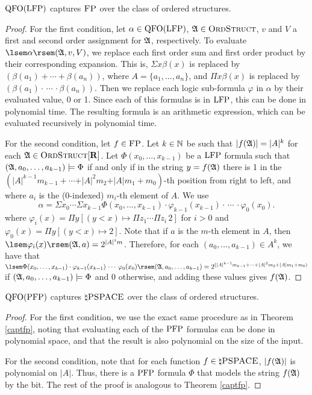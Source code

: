 \begin{theorem} \label{captfp}
	${\rm QFO}({\rm LFP})$ captures $\text{\sc FP}$ over the class of ordered structures.
\end{theorem}
\begin{proof}
	For the first condition, let $\alpha\in{\rm QFO}({\rm LFP})$, $\mathfrak{A}\in\text{\sc OrdStruct}$, $v$ and $V$ a first and second order assignment for $\mathfrak{A}$, respectively. To evaluate $\sem{\alpha}(\A,v,V)$, we replace each first order sum and first order product by their corresponding expansion. This is, $\Sigma x \beta(x)$ is replaced by $(\beta(a_1)+\cdots+\beta(a_n))$, where $A = \{a_1,\ldots,a_n\}$, and $\Pi x \beta(x)$ is replaced by $(\beta(a_1)\cdot\,\cdots\,\cdot\beta(a_n))$. Then we replace each logic sub-formula $\varphi$ in $\alpha$ by their evaluated value, 0 or 1. Since each of this formulas is in ${\rm LFP}$, this can be done in polynomial time. The resulting formula is an arithmetic expression, which can be evaluated recursively in polynomial time.
	
	For the second condition, let $f\in \text{\sc FP}$. Let $k\in\mathbb{N}$ be such that $\vert f(\mathfrak{A}) \vert = \vert A \vert^k$ for each $\mathfrak{A}\in\text{\sc OrdStruct}[\mathbf{R}]$. Let $\Phi(x_0,\ldots,x_{k-1})$ be a ${\rm LFP}$ formula such that $(\mathfrak{A},a_0,\ldots,a_{k-1})\models\Phi$ if and only if in the string $y = f(\mathfrak{A})$ there is 1 in the $(\vert A \vert^{k-1}m_{k-1} + \cdots + \vert A \vert^2 m_2 + \vert A \vert m_1 + m_0)$-th position from right to left, and where $a_i$ is the (0-indexed) $m_i$-th element of $A$. We use
	$$
	\alpha = \Sigma x_0 \cdots \Sigma x_{k-1} \Phi(x_0,\ldots,x_{k-1})\cdot\varphi_{k-1}(x_{k-1})\cdot\,\cdots\,\cdot\varphi_0(x_0).
	$$
	where $\varphi_i(x) = \Pi y[(y < x)\mapsto\Pi z_1\cdots\Pi z_i\,2]$ for $i > 0$ and $\varphi_0(x) = \Pi y[(y < x)\mapsto 2]$. Note that if $a$ is the  $m$-th element in $A$, then $\sem{\varphi_i(x)}(\A,a) = 2^{\vert A \vert^i m}$. Therefore, for each $(a_0,\ldots,a_{k-1})\in A^k$, we have that $\sem{\Phi(x_0,\ldots,x_{k-1})\cdot\varphi_{k-1}(x_{k-1})\,\cdots\,\varphi_0(x_0)}(\A,a_0,\ldots,a_{k-1}) = 2^{(\vert A \vert^{k-1}m_{k-1} + \cdots + \vert A \vert^2 m_2 + \vert A \vert m_1 + m_0)}$ if $(\mathfrak{A},a_0,\ldots,a_{k-1})\models\Phi$ and 0 otherwise, and adding these values gives $f(\mathfrak{A})$. 	
\end{proof}

\begin{theorem}
	${\rm QFO}({\rm PFP})$ captures $\natural\text{\sc PSPACE}$ over the class of ordered structures.
\end{theorem}
\begin{proof}
	For the first condition, we use the exact same procedure as in Theorem \ref{captfp}, noting that evaluating each of the ${\rm PFP}$ formulas can be done in polynomial space, and that the result is also polynomial on the size of the input.
	
	For the second condition, note that for each function $f\in \natural\text{\sc PSPACE}$, $\vert f(\mathfrak{A}) \vert$ is polynomial on $\vert A \vert$. Thus, there is a ${\rm PFP}$ formula $\Phi$ that models the string $f(\mathfrak{A})$ by the bit. The rest of the proof is analogous to Theorem \ref{captfp}.
\end{proof}

